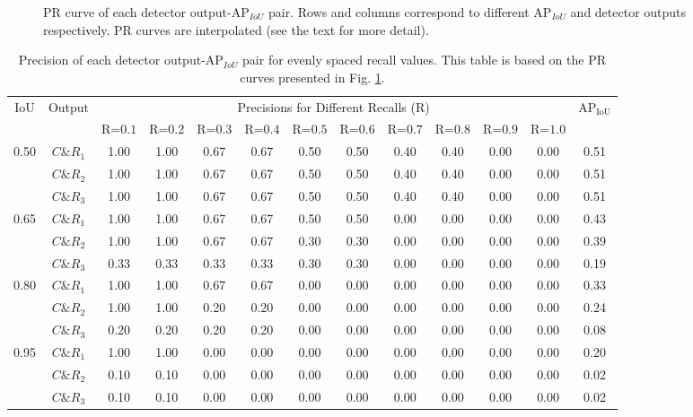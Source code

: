 \documentclass{article}
\begin{document}
\begin{figure}
\caption{PR curve of each detector output-$\mathrm{AP}_{IoU}$ pair. Rows and columns correspond to different $\mathrm{AP}_{IoU}$ and detector outputs respectively. PR curves are interpolated (see the text for more detail).}
\label{fig:pr_curves}
\end{figure}



\begin{table}[t]

    \centering
    \caption{Precision of each detector output-$\mathrm{AP}_{IoU}$ pair for evenly spaced recall values. This table is based on the PR curves presented in Fig. \ref{fig:pr_curves}.}
    \label{tab:perf_calculation}
    \setlength{\tabcolsep}{0.25em}
    \begin{tabular}{|c|c|c|c|c|c|c|c|c|c|c|c|c|} \hline
         \multirow{2}{*}{IoU}&\multirow{2}{*}{Output}&\multicolumn{10}{|c|}{Precisions for Different Recalls (R)}&\multirow{2}{*}{$\mathrm{AP_\mathrm{IoU}}$}\\ \cline{3-12}
         & &R=$0.1$&R=$0.2$&R=$0.3$&R=$0.4$&R=$0.5$&R=$0.6$&R=$0.7$&R=$0.8$&R=$0.9$&R=$1.0$& \\ \hline\hline
         \multirow{3}{*}{0.50}
         &$C\&R_1$&1.00&1.00&0.67&0.67&0.50&0.50&0.40&0.40&0.00&0.00&0.51\\
         &$C\&R_2$&1.00&1.00&0.67&0.67&0.50&0.50&0.40&0.40&0.00&0.00&0.51\\
         &$C\&R_3$&1.00&1.00&0.67&0.67&0.50&0.50&0.40&0.40&0.00&0.00&0.51\\
         \hline
         \multirow{3}{*}{0.65}
         &$C\&R_1$&1.00&1.00&0.67&0.67&0.50&0.50&0.00&0.00&0.00&0.00&0.43\\
         &$C\&R_2$&1.00&1.00&0.67&0.67&0.30&0.30&0.00&0.00&0.00&0.00&0.39\\
         &$C\&R_3$&0.33&0.33&0.33&0.33&0.30&0.30&0.00&0.00&0.00&0.00&0.19\\
         \hline
         \multirow{3}{*}{0.80}
         &$C\&R_1$&1.00&1.00&0.67&0.67&0.00&0.00&0.00&0.00&0.00&0.00&0.33\\
         &$C\&R_2$&1.00&1.00&0.20&0.20&0.00&0.00&0.00&0.00&0.00&0.00&0.24\\
         &$C\&R_3$&0.20&0.20&0.20&0.20&0.00&0.00&0.00&0.00&0.00&0.00&0.08\\
         \hline
         \multirow{3}{*}{0.95}
         &$C\&R_1$&1.00&1.00&0.00&0.00&0.00&0.00&0.00&0.00&0.00&0.00&0.20\\
         &$C\&R_2$&0.10&0.10&0.00&0.00&0.00&0.00&0.00&0.00&0.00&0.00&0.02\\
         &$C\&R_3$&0.10&0.10&0.00&0.00&0.00&0.00&0.00&0.00&0.00&0.00&0.02 \\
         \hline
    \end{tabular}
\end{table}
\end{document}
